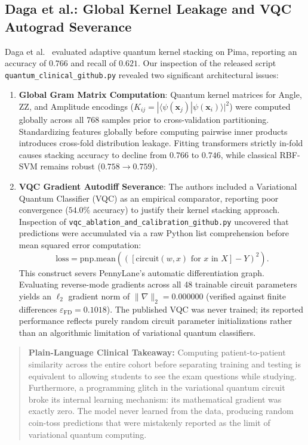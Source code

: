 \documentclass[journal,twocolumn]{IEEEtran}
\begin{document}
\subsection{Daga et al.: Global Kernel Leakage and VQC Autograd Severance}
Daga et al.~\cite{daga2026adaptive} evaluated adaptive quantum kernel stacking on Pima, reporting an accuracy of $0.766$ and recall of $0.621$. Our inspection of the released script \texttt{quantum\_clinical\_github.py} revealed two significant architectural issues:
\begin{enumerate}
    \item \textbf{Global Gram Matrix Computation}: Quantum kernel matrices for Angle, ZZ, and Amplitude encodings ($K_{ij} = |\langle\psi(\mathbf{x}_j)|\psi(\mathbf{x}_i)\rangle|^2$) were computed globally across all 768 samples prior to cross-validation partitioning. Standardizing features globally before computing pairwise inner products introduces cross-fold distribution leakage. Fitting transformers strictly in-fold causes stacking accuracy to decline from $0.766$ to $0.746$, while classical RBF-SVM remains robust ($0.758 \to 0.759$).
    \item \textbf{VQC Gradient Autodiff Severance}: The authors included a Variational Quantum Classifier (VQC) as an empirical comparator, reporting poor convergence ($54.0\%$ accuracy) to justify their kernel stacking approach. Inspection of \texttt{vqc\_ablation\_and\_calibration\_github.py} uncovered that predictions were accumulated via a raw Python list comprehension before mean squared error computation:
    \begin{equation}
    \text{loss} = \text{pnp.mean}(([\text{circuit}(w, x) \text{ for } x \text{ in } X] - Y)^2).
    \end{equation}
    This construct severs PennyLane's automatic differentiation graph. Evaluating reverse-mode gradients across all 48 trainable circuit parameters yields an $\ell_2$ gradient norm of $\|\nabla\|_2 = 0.000000$ (verified against finite differences $\varepsilon_{\text{FD}} = 0.1018$). The published VQC was never trained; its reported performance reflects purely random circuit parameter initializations rather than an algorithmic limitation of variational quantum classifiers.
\end{enumerate}

\begin{quote}
\small
\textbf{Plain-Language Clinical Takeaway:} Computing patient-to-patient similarity across the entire cohort before separating training and testing is equivalent to allowing students to see the exam questions while studying. Furthermore, a programming glitch in the variational quantum circuit broke its internal learning mechanism: its mathematical gradient was exactly zero. The model never learned from the data, producing random coin-toss predictions that were mistakenly reported as the limit of variational quantum computing.
\end{quote}
\end{document}
